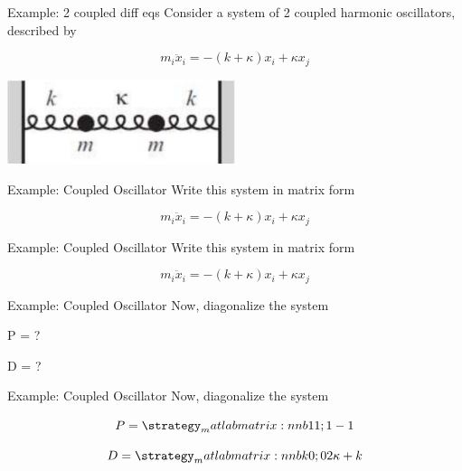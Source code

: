 	\begin{frame}{Example: 2 coupled diff eqs}
	    Consider a system of 2 coupled harmonic oscillators, described by

        $$m_i\ddot{x}_i = -(k + \kappa)x_i + \kappa{}x_j$$
        
        \begin{center}
            \includegraphics[width=0.5\textwidth]{./images/coupled-eq-1.png}
        \end{center}
	\end{frame}
	
	\begin{frame}{Example: Coupled Oscillator}
	    Write this system in matrix form
        
        $$m_i\ddot{x}_i = -(k + \kappa)x_i + \kappa{}x_j$$
	\end{frame}
	
	\begin{frame}{Example: Coupled Oscillator}
	    Write this system in matrix form
        
        $$m_i\ddot{x}_i = -(k + \kappa)x_i + \kappa{}x_j$$
        
        \begin{center}
        \end{center}
	\end{frame}
	
	\begin{frame}{Example: Coupled Oscillator}
	    Now, diagonalize the system

	    \begin{center}
        \end{center}
        
        P = ?
        
        D = ?
	\end{frame}
	
	\begin{frame}{Example: Coupled Oscillator}
	    Now, diagonalize the system

	    \begin{center}
        \end{center}
        
        $$P = \mat{1 1; 1 -1}$$
        
        $$D = \mat{k 0; 0 2\kappa+k}$$
	\end{frame}
	
